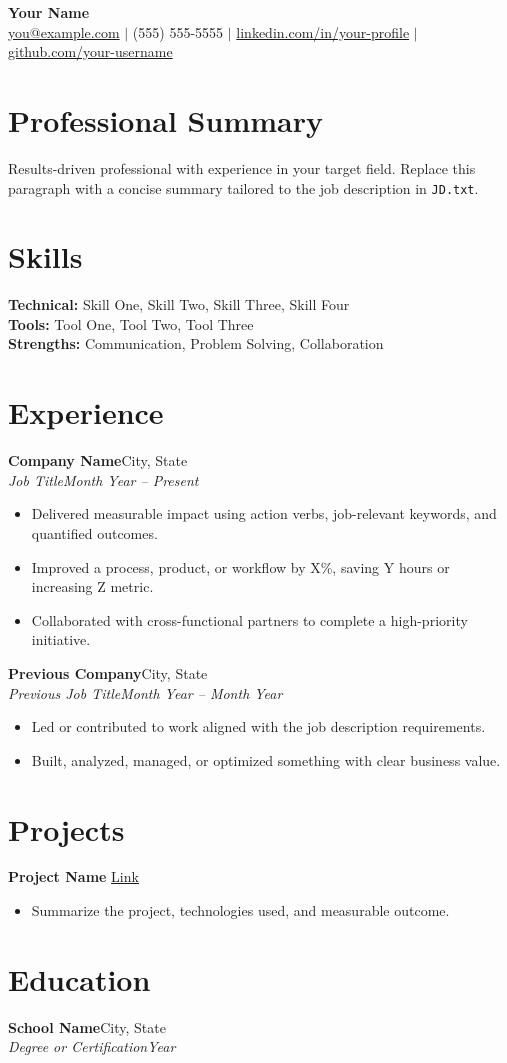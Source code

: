 \documentclass[11pt,letterpaper]{article}
\newcommand{\resumeSubheading}[4]{%
  \textbf{#1}\hfill #2\\
  \textit{#3}\hfill \textit{#4}\vspace{2pt}
}
\begin{document}
\begin{center}
  {\LARGE \textbf{Your Name}}\\
  \href{mailto:you@example.com}{you@example.com} $\vert$ (555) 555-5555 $\vert$
  \href{https://www.linkedin.com/in/your-profile}{linkedin.com/in/your-profile} $\vert$
  \href{https://github.com/your-username}{github.com/your-username}
\end{center}

\section*{Professional Summary}
Results-driven professional with experience in your target field. Replace this paragraph with a concise summary tailored to the job description in \texttt{JD.txt}.

\section*{Skills}
\textbf{Technical:} Skill One, Skill Two, Skill Three, Skill Four\\
\textbf{Tools:} Tool One, Tool Two, Tool Three\\
\textbf{Strengths:} Communication, Problem Solving, Collaboration

\section*{Experience}
\resumeSubheading{Company Name}{City, State}{Job Title}{Month Year -- Present}
\begin{itemize}
  \item Delivered measurable impact using action verbs, job-relevant keywords, and quantified outcomes.
  \item Improved a process, product, or workflow by X\%, saving Y hours or increasing Z metric.
  \item Collaborated with cross-functional partners to complete a high-priority initiative.
\end{itemize}

\resumeSubheading{Previous Company}{City, State}{Previous Job Title}{Month Year -- Month Year}
\begin{itemize}
  \item Led or contributed to work aligned with the job description requirements.
  \item Built, analyzed, managed, or optimized something with clear business value.
\end{itemize}

\section*{Projects}
\textbf{Project Name} \hfill \href{https://example.com}{Link}
\begin{itemize}
  \item Summarize the project, technologies used, and measurable outcome.
\end{itemize}

\section*{Education}
\resumeSubheading{School Name}{City, State}{Degree or Certification}{Year}
\end{document}
